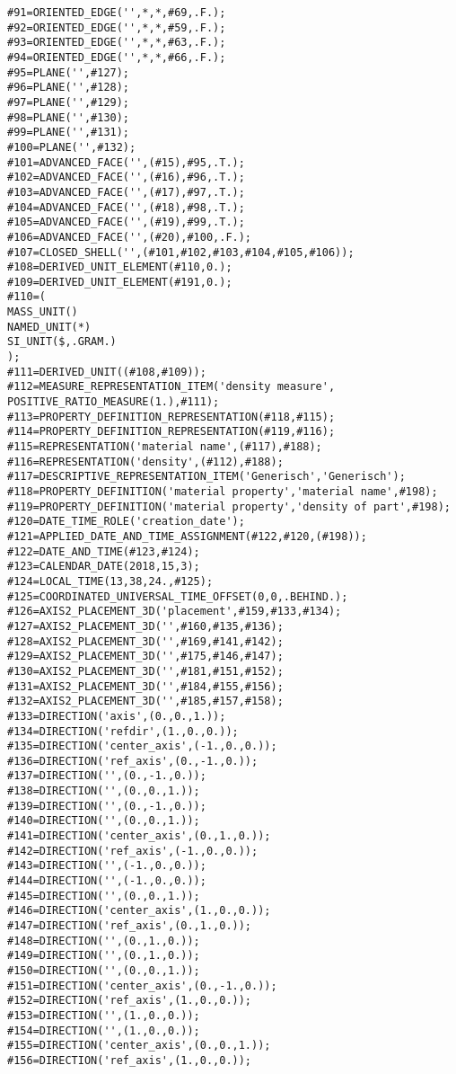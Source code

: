 \begin{lstlisting}[captionpos=b, style=customc, caption=Beschreibung eines Quaders in STEP, label=lis:simplestpanh]
#91=ORIENTED_EDGE('',*,*,#69,.F.);
#92=ORIENTED_EDGE('',*,*,#59,.F.);
#93=ORIENTED_EDGE('',*,*,#63,.F.);
#94=ORIENTED_EDGE('',*,*,#66,.F.);
#95=PLANE('',#127);
#96=PLANE('',#128);
#97=PLANE('',#129);
#98=PLANE('',#130);
#99=PLANE('',#131);
#100=PLANE('',#132);
#101=ADVANCED_FACE('',(#15),#95,.T.);
#102=ADVANCED_FACE('',(#16),#96,.T.);
#103=ADVANCED_FACE('',(#17),#97,.T.);
#104=ADVANCED_FACE('',(#18),#98,.T.);
#105=ADVANCED_FACE('',(#19),#99,.T.);
#106=ADVANCED_FACE('',(#20),#100,.F.);
#107=CLOSED_SHELL('',(#101,#102,#103,#104,#105,#106));
#108=DERIVED_UNIT_ELEMENT(#110,0.);
#109=DERIVED_UNIT_ELEMENT(#191,0.);
#110=(
MASS_UNIT()
NAMED_UNIT(*)
SI_UNIT($,.GRAM.)
);
#111=DERIVED_UNIT((#108,#109));
#112=MEASURE_REPRESENTATION_ITEM('density measure',
POSITIVE_RATIO_MEASURE(1.),#111);
#113=PROPERTY_DEFINITION_REPRESENTATION(#118,#115);
#114=PROPERTY_DEFINITION_REPRESENTATION(#119,#116);
#115=REPRESENTATION('material name',(#117),#188);
#116=REPRESENTATION('density',(#112),#188);
#117=DESCRIPTIVE_REPRESENTATION_ITEM('Generisch','Generisch');
#118=PROPERTY_DEFINITION('material property','material name',#198);
#119=PROPERTY_DEFINITION('material property','density of part',#198);
#120=DATE_TIME_ROLE('creation_date');
#121=APPLIED_DATE_AND_TIME_ASSIGNMENT(#122,#120,(#198));
#122=DATE_AND_TIME(#123,#124);
#123=CALENDAR_DATE(2018,15,3);
#124=LOCAL_TIME(13,38,24.,#125);
#125=COORDINATED_UNIVERSAL_TIME_OFFSET(0,0,.BEHIND.);
#126=AXIS2_PLACEMENT_3D('placement',#159,#133,#134);
#127=AXIS2_PLACEMENT_3D('',#160,#135,#136);
#128=AXIS2_PLACEMENT_3D('',#169,#141,#142);
#129=AXIS2_PLACEMENT_3D('',#175,#146,#147);
#130=AXIS2_PLACEMENT_3D('',#181,#151,#152);
#131=AXIS2_PLACEMENT_3D('',#184,#155,#156);
#132=AXIS2_PLACEMENT_3D('',#185,#157,#158);
#133=DIRECTION('axis',(0.,0.,1.));
#134=DIRECTION('refdir',(1.,0.,0.));
#135=DIRECTION('center_axis',(-1.,0.,0.));
#136=DIRECTION('ref_axis',(0.,-1.,0.));
#137=DIRECTION('',(0.,-1.,0.));
#138=DIRECTION('',(0.,0.,1.));
#139=DIRECTION('',(0.,-1.,0.));
#140=DIRECTION('',(0.,0.,1.));
#141=DIRECTION('center_axis',(0.,1.,0.));
#142=DIRECTION('ref_axis',(-1.,0.,0.));
#143=DIRECTION('',(-1.,0.,0.));
#144=DIRECTION('',(-1.,0.,0.));
#145=DIRECTION('',(0.,0.,1.));
#146=DIRECTION('center_axis',(1.,0.,0.));
#147=DIRECTION('ref_axis',(0.,1.,0.));
#148=DIRECTION('',(0.,1.,0.));
#149=DIRECTION('',(0.,1.,0.));
#150=DIRECTION('',(0.,0.,1.));
#151=DIRECTION('center_axis',(0.,-1.,0.));
#152=DIRECTION('ref_axis',(1.,0.,0.));
#153=DIRECTION('',(1.,0.,0.));
#154=DIRECTION('',(1.,0.,0.));
#155=DIRECTION('center_axis',(0.,0.,1.));
#156=DIRECTION('ref_axis',(1.,0.,0.));

\end{lstlisting}
